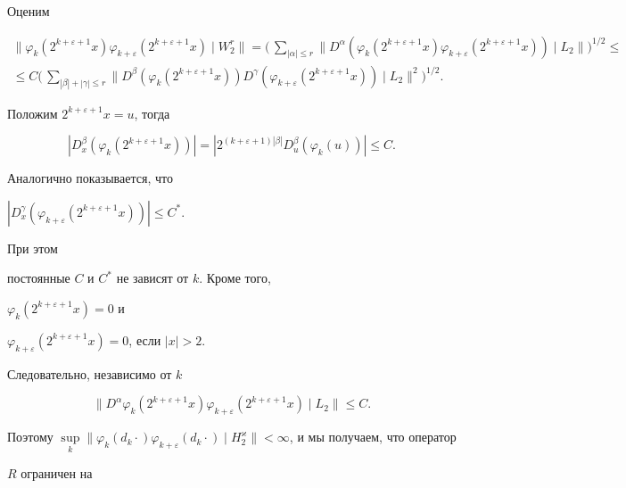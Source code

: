 Оценим 


\begin{multline*} 


\|\varphi_k(2^{k+\varepsilon+1}x)\varphi_{k+\varepsilon} 


(2^{k+\varepsilon+1}x)\mid W^r_2\|=\Big(\,\sum_{|\alpha|\le r} 


\|D^\alpha(\varphi_k(2^{k+\varepsilon+1}x) 


\varphi_{k+\varepsilon}(2^{k+\varepsilon+1}x))\mid 


L_2\|\Big)^{1/2} \le \\ 


\le C\Big(\,\sum_{|\beta|+|\gamma|\le r}\|D^\beta 


(\varphi_k(2^{k+\varepsilon+1}x))D^\gamma(\varphi_{k+\varepsilon} 


(2^{k+\varepsilon+1}x))\mid L_2\|^2\Big)^{1/2}. 


\end{multline*} 


Положим $2^{k+\varepsilon+1}x=u$, тогда 


$$ 


|D^\beta_x(\varphi_k(2^{k+\varepsilon+1}x))|= 


|2^{(k+\varepsilon+1)|\beta|}D^\beta_u 


(\varphi_k(u))|\le C.


$$ 


Аналогично показывается, что 


$|D^\gamma_x(\varphi_{k+\varepsilon}(2^{k+\varepsilon+1}x))|\le C^*$. 


При этом 


постоянные $C$ и $C^*$ не зависят от $k$. Кроме того, 


$\varphi_k(2^{k+\varepsilon+1}x)=0$ и 


$\varphi_{k+\varepsilon}(2^{k+\varepsilon+1}x)=0$, если $|x|>2$. 


Следовательно, независимо от $k$ 


$$ 


\|D^\alpha\varphi_k(2^{k+\varepsilon+1}x) 


\varphi_{k+\varepsilon}(2^{k+\varepsilon+1}x)\mid L_2\|\le C. 


$$ 


Поэтому $\sup\limits_k\|\varphi_k(d_k\cdot)\varphi_{k+\varepsilon} 


(d_k\cdot)\mid H^\varkappa_2\|<\infty$, и мы получаем, что оператор 


$R$ ограничен на 


